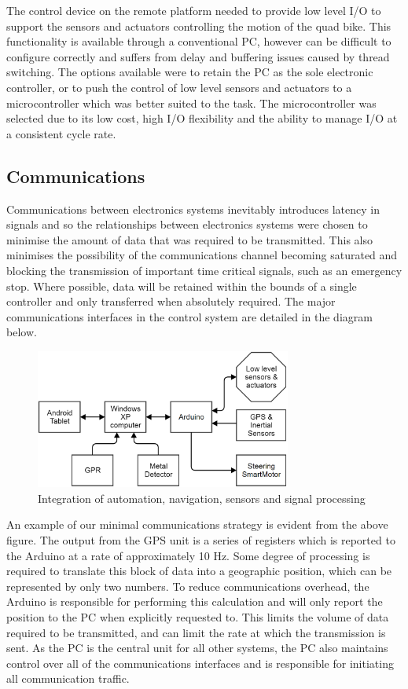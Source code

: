 \documentclass[main.tex]{subfiles}
\begin{document}
The control device on the remote platform needed to provide low level I/O to support the sensors and actuators controlling the motion of the quad bike. This functionality is available through a conventional PC, however can be difficult to configure correctly and suffers from delay and buffering issues caused by thread switching. The options available were to retain the PC as the sole electronic controller, or to push the control of low level sensors and actuators to a microcontroller which was better suited to the task. The microcontroller was selected due to its low cost, high I/O flexibility and the ability to manage I/O at a consistent cycle rate. 


\subsection{Communications}
Communications between electronics systems inevitably introduces latency in signals and so the relationships between electronics systems were chosen to minimise the amount of data that was required to be transmitted. This also minimises the possibility of the communications channel becoming saturated and blocking the transmission of important time critical signals, such as an emergency stop. Where possible, data will be retained within the bounds of a single controller and only transferred when absolutely required. The major communications interfaces in the control system are detailed in the diagram below.

\begin{figure}[ht]
\includegraphics[width=0.75\textwidth]{3-ConceptDesign/communications.png}
\centering
\caption{Integration of automation, navigation, sensors and signal processing} 
\end{figure}

An example of our minimal communications strategy is evident from the above figure. The output from the GPS unit is a series of registers which is reported to the Arduino at a rate of approximately 10 Hz. Some degree of processing is required to translate this block of data into a geographic position, which can be represented by only two numbers. To reduce communications overhead, the Arduino is responsible for performing this calculation and will only report the position to the PC when explicitly requested to. This limits the volume of data required to be transmitted, and can limit the rate at which the transmission is sent. As the PC is the central unit for all other systems, the PC also maintains control over all of the communications interfaces and is responsible for initiating all communication traffic.
\end{document}
